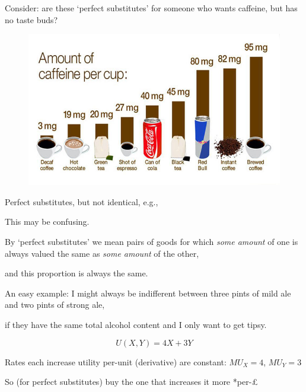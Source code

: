 \documentclass[table]{beamer}
\begin{document}
\begin{frame}

Consider: are these `perfect substitutes' for someone who wants
caffeine, but has no taste buds?

\begin{figure}

{\centering \includegraphics[width=0.9\linewidth]{picsfigs/amount-of-caffeine-in-drinks} 

}

\end{figure}

\end{frame}

\begin{frame}

\begin{block}{Perfect substitutes, but not identical, e.g.,}

This may be confusing.

By `perfect substitutes' we mean pairs of goods for which \emph{some
amount} of one is always valued the same as \emph{some amount} of the
other,

and this proportion is always the same.

An easy example: I might always be indifferent between three pints of
mild ale and two pints of strong ale,

if they have the same total alcohol content and I only want to get
tipsy.

\[U(X,Y)=4X+3Y\]

Rates each increase utility per-unit (derivative) are constant:
\(MU_X = 4\), \(MU_Y = 3\)

So (for perfect substitutes) buy the one that increases it more
*per-\pounds*

\end{block}

\end{frame}
\end{document}
